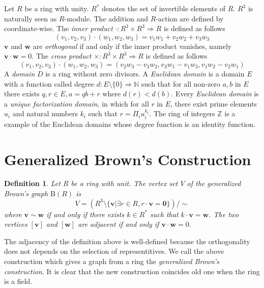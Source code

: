 \documentclass{article}
\newtheorem{Def}{Definition}
\newcommand{\Z}{\mathbb Z}
\newcommand{\N}{\mathbb N}
\newcommand{\B}{\mathrm{B}}
\begin{document}
\iffalse

The {\it tensor product} of two graphs $G_1=(V_1,E_1),G_2=(V_2,E_2)$ is a graph $G_1 \otimes G_2$ such that the vertex set is a cartesian product of $V_1$ and $V_2$ and two vertices $(v_1,v_2) \sim (w_1,w_2)$ if and only if $v_1 \sim v_2$ and $w_1 \sim w_2$. If $G_1, G_2$ are regular, the tensor product $G_1 \times G_2$ is also regular. 

\fi

Let $R$ be a ring with unity. 
$R^*$ denotes the set of invertible elements of $R$.
$R^3$ is naturally seen as $R$-module. 
The addition and $R$-action are defined by coordinate-wise.
The {\it inner product} $\cdot: R^3 \times R^3 \Rightarrow R$ is defined as follows
\[ (v_1,v_2,v_3) \cdot (w_1,w_2,w_3) = v_1 w_1 + v_2 w_2 + v_3 w_3 \]
${\bm v}$ and ${\bm w}$ are {\it orthogonal} if and only if the inner product vanishes, namely ${\bm v} \cdot {\bm w} = 0$.
The {\it cross product} $\times: R^3 \times R^3 \Rightarrow R$ is defined as follows
\[ (v_1,v_2,v_3) \cdot (w_1,w_2,w_3) = ( v_2 w_3 - v_3 w_2, v_3 w_1 - v_1 w_3, v_1 w_2 - v_2 w_1 ) \]
A {\it domain} $D$ is a ring without zero divisors.
A {\it Euclidean domain} is a domain $E$ with a function called degree $d: E \setminus \{0\} \Rightarrow \N$ such that for all non-zero $a,b$ in $E$ there exists $q,r \in E, a = q b + r$ where $d(r) < d(b)$. Every {\it Euclidean domain} is a {\it unique factorization domain}, in which for all $r$ in $E$, there exist prime elements $u_i$ and natural numbers $k_i$ such that $r = \Pi_i u_i^{k_i}$.
The ring of integers $\Z$ is a example of the Euclidean domains whose degree function is an identity function.


\section{Generalized Brown's Construction}
\begin{Def}
Let $R$ be a ring with unit. The vertex set $V$ of the generalized Brown's graph $\B(R)$ is \[ V = ( R^3 \setminus \{\bm v | \exists r \in R, r \cdot {\bm v} = {\bm 0} \} ) / \sim\]
where $\bm v \sim \bm w$ if and only if there exists $k \in R^*$ such that $k \cdot {\bm v} = {\bm w}$. The two vertices $[\bm v]$ and $[\bm w]$ are adjacent if and only if ${\bm v} \cdot {\bm w} = 0$.
\end{Def}

The adjacency of the definition above is well-defined because the orthogonality does not depends on the selection of representitives. We call the above construction which gives a graph from a ring the {\it generalized Brown's construction}. It is clear that the new construction coincides old one when the ring is a field. 
\end{document}
